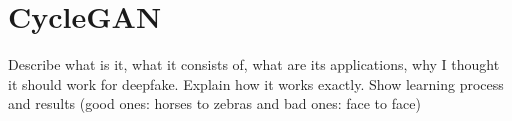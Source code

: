 \section{CycleGAN}
Describe what is it, what it consists of, what are its applications, why I thought it should work for deepfake. Explain how it works exactly. Show learning process and results (good ones: horses to zebras and bad ones: face to face)